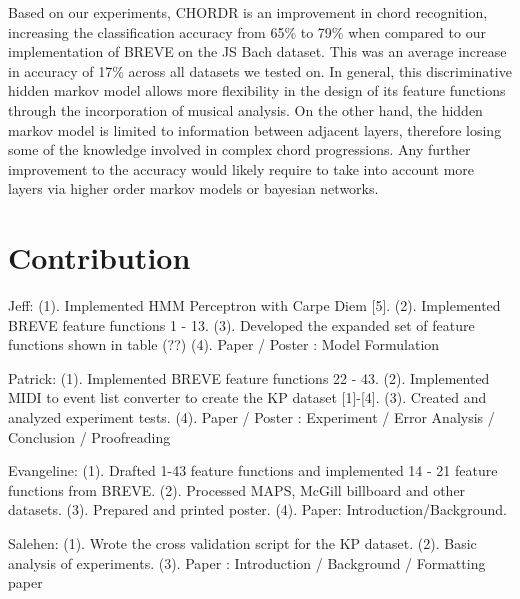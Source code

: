 \documentclass{article} %
\begin{document}
Based on our experiments, CHORDR is an improvement in chord recognition, increasing the classification accuracy from 65\% to 79\% when compared to our implementation of BREVE on the JS Bach dataset. This was an average increase in accuracy of 17\% across all datasets we tested on. In general, this discriminative hidden markov model allows more flexibility in the design of its feature functions through the incorporation of musical analysis. On the other hand, the hidden markov model is limited to information between adjacent layers, therefore losing some of the knowledge involved in complex chord progressions. Any further improvement to the accuracy would likely require to take into account more layers via higher order markov models or bayesian networks.

\section{Contribution}

Jeff: (1). Implemented HMM Perceptron with Carpe Diem [5]. (2). Implemented BREVE feature functions 1 - 13. (3). Developed the expanded set of feature functions shown in table (??) (4). Paper / Poster : Model Formulation

Patrick: (1). Implemented BREVE feature functions 22 - 43. (2). Implemented MIDI to event list converter to create the KP dataset [1]-[4]. (3). Created and analyzed experiment tests. (4). Paper / Poster : Experiment / Error Analysis / Conclusion / Proofreading

Evangeline: (1). Drafted 1-43 feature functions and implemented 14 - 21 feature functions from BREVE. (2). Processed MAPS, McGill billboard and other datasets. (3). Prepared and printed poster. (4). Paper: Introduction/Background.

Salehen: (1). Wrote the cross validation script for the KP dataset. (2). Basic analysis of experiments. (3). Paper : Introduction / Background / Formatting paper
\end{document}
